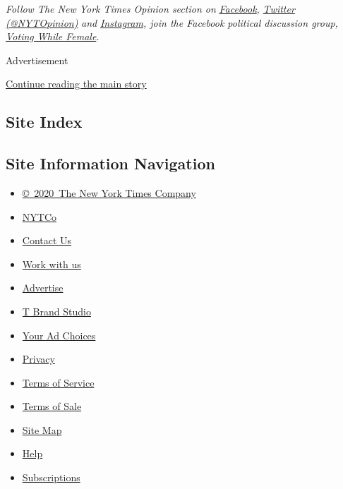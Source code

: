 \emph{Follow The New York Times Opinion section on}
\href{https://www.facebookcorewwwi.onion/nytopinion}{\emph{Facebook}}\emph{,}
\href{http://twitter.com/NYTOpinion}{\emph{Twitter (@NYTOpinion)}}
\emph{and}
\href{https://www.instagram.com/nytopinion/}{\emph{Instagram}}\emph{,
join the Facebook political discussion group,}
\href{https://www.facebookcorewwwi.onion/groups/votingwhilefemale/}{\emph{Voting
While Female}}\emph{.}

Advertisement

\protect\hyperlink{after-bottom}{Continue reading the main story}

\hypertarget{site-index}{%
\subsection{Site Index}\label{site-index}}

\hypertarget{site-information-navigation}{%
\subsection{Site Information
Navigation}\label{site-information-navigation}}

\begin{itemize}
\tightlist
\item
  \href{https://help.nytimes3xbfgragh.onion/hc/en-us/articles/115014792127-Copyright-notice}{©~2020~The
  New York Times Company}
\end{itemize}

\begin{itemize}
\tightlist
\item
  \href{https://www.nytco.com/}{NYTCo}
\item
  \href{https://help.nytimes3xbfgragh.onion/hc/en-us/articles/115015385887-Contact-Us}{Contact
  Us}
\item
  \href{https://www.nytco.com/careers/}{Work with us}
\item
  \href{https://nytmediakit.com/}{Advertise}
\item
  \href{http://www.tbrandstudio.com/}{T Brand Studio}
\item
  \href{https://www.nytimes3xbfgragh.onion/privacy/cookie-policy\#how-do-i-manage-trackers}{Your
  Ad Choices}
\item
  \href{https://www.nytimes3xbfgragh.onion/privacy}{Privacy}
\item
  \href{https://help.nytimes3xbfgragh.onion/hc/en-us/articles/115014893428-Terms-of-service}{Terms
  of Service}
\item
  \href{https://help.nytimes3xbfgragh.onion/hc/en-us/articles/115014893968-Terms-of-sale}{Terms
  of Sale}
\item
  \href{https://spiderbites.nytimes3xbfgragh.onion}{Site Map}
\item
  \href{https://help.nytimes3xbfgragh.onion/hc/en-us}{Help}
\item
  \href{https://www.nytimes3xbfgragh.onion/subscription?campaignId=37WXW}{Subscriptions}
\end{itemize}
